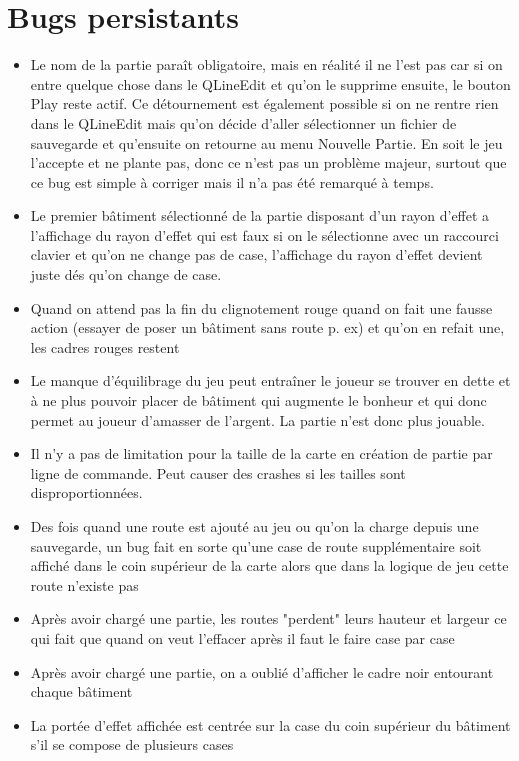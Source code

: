 \documentclass[a4paper,10pt,openany,oneside]{report}
\begin{document}
\section{Bugs persistants}
\begin{itemize}
\item Le nom de la partie paraît obligatoire, mais en réalité il ne l'est pas car si on entre quelque chose dans le QLineEdit et qu'on le supprime ensuite, le bouton Play reste actif. Ce détournement est également possible si on ne rentre rien dans le QLineEdit mais qu'on décide d'aller sélectionner un fichier de sauvegarde et qu'ensuite on retourne au menu Nouvelle Partie.
En soit le jeu l'accepte et ne plante pas, donc ce n'est pas un problème majeur, surtout que ce bug est simple à corriger mais il n'a pas été remarqué à temps.
\item Le premier bâtiment sélectionné de la partie disposant d'un rayon d'effet a l'affichage du rayon d'effet qui est faux si on le sélectionne avec un raccourci clavier et qu'on ne change pas de case, l'affichage du rayon d'effet devient juste dés qu'on change de case.
\item Quand on attend pas la fin du clignotement rouge quand on fait une fausse action (essayer de poser un bâtiment sans route p. ex) et qu'on en refait une, les cadres rouges restent
\item Le manque d'équilibrage du jeu peut entraîner le joueur se trouver en dette et à ne plus pouvoir placer de bâtiment qui augmente le bonheur et qui donc permet au joueur d'amasser de l'argent. La partie n'est donc plus jouable.
\item Il n'y a pas de limitation pour la taille de la carte en création de partie par ligne de commande. Peut causer des crashes si les tailles sont disproportionnées.
\item Des fois quand une route est ajouté au jeu ou qu'on la charge depuis une sauvegarde, un bug fait en sorte qu'une case de route supplémentaire soit affiché dans le coin supérieur de la carte alors que dans la logique de jeu cette route n'existe pas
\item Après avoir chargé une partie, les routes "perdent" leurs hauteur et largeur ce qui fait que quand on veut l'effacer après il faut le faire case par case
\item Après avoir chargé une partie, on a oublié d'afficher le cadre noir entourant chaque bâtiment
\item La portée d'effet affichée est centrée sur la case du coin supérieur du bâtiment s'il se compose de plusieurs cases

\end{itemize}
\end{document}
